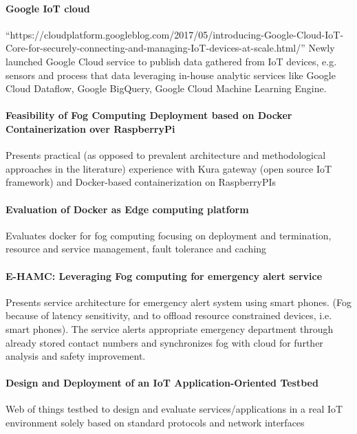 \paragraph{Google IoT cloud}
``https://cloudplatform.googleblog.com/2017/05/introducing-Google-Cloud-IoT-Core-for-securely-connecting-and-managing-IoT-devices-at-scale.html/'' Newly launched Google Cloud service to publish data gathered from IoT devices, e.g. sensors and process that data leveraging in-house analytic services like Google Cloud Dataflow, Google BigQuery, Google Cloud Machine Learning Engine.

\paragraph{Feasibility of Fog Computing Deployment based on Docker Containerization over RaspberryPi} \cite{bellavista_feasibility_2017}
Presents practical (as opposed to prevalent architecture and methodological approaches in the literature) experience with Kura gateway (open source IoT framework) and Docker-based containerization on RaspberryPIs

\paragraph{Evaluation of Docker as Edge computing platform}\cite{ismail_evaluation_2015}
Evaluates docker for fog computing focusing on deployment and termination, resource and service management, fault tolerance and caching

\paragraph{E-HAMC: Leveraging Fog computing for emergency alert service} \cite{7134091}
Presents service architecture for emergency alert system using smart phones. (Fog because of latency sensitivity, and to offload resource constrained devices, i.e. smart phones). The service alerts appropriate emergency department through already stored contact numbers and synchronizes fog with cloud for further analysis and safety improvement.

\paragraph{Design and Deployment of an IoT Application-Oriented Testbed}\cite{belli_design_2015}
Web of things testbed to design and evaluate services/applications in a real IoT environment solely based on standard protocols and network interfaces

